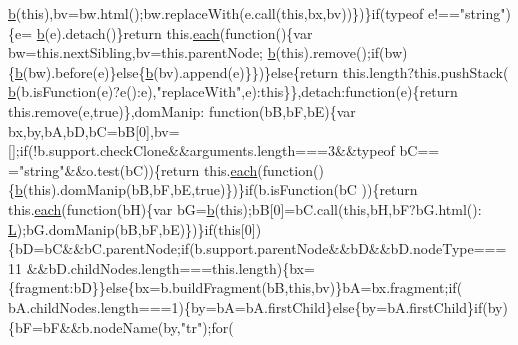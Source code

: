 \begin{DoxyCode}
{      \hyperlink{jquery_8js_aa4026ad5544b958e54ce5e106fa1c805}{b}(\textcolor{keyword}{this}),bv=bw.html();bw.replaceWith(e.call(\textcolor{keyword}{this},bx,bv))\})\}\textcolor{keywordflow}{if}(typeof e!==\textcolor{stringliteral}{"string"})\{e=
      \hyperlink{jquery_8js_aa4026ad5544b958e54ce5e106fa1c805}{b}(e).detach()\}\textcolor{keywordflow}{return} this.\hyperlink{jquery_8js_a871ff39db627c54c710a3e9909b8234c}{each}(\textcolor{keyword}{function}()\{var bw=this.nextSibling,bv=this.parentNode;
      \hyperlink{jquery_8js_aa4026ad5544b958e54ce5e106fa1c805}{b}(\textcolor{keyword}{this}).remove();\textcolor{keywordflow}{if}(bw)\{\hyperlink{jquery_8js_aa4026ad5544b958e54ce5e106fa1c805}{b}(bw).before(e)\}\textcolor{keywordflow}{else}\{\hyperlink{jquery_8js_aa4026ad5544b958e54ce5e106fa1c805}{b}(bv).append(e)\}\})\}\textcolor{keywordflow}{else}\{\textcolor{keywordflow}{return} this.length?this.pushStack(
      \hyperlink{jquery_8js_aa4026ad5544b958e54ce5e106fa1c805}{b}(b.isFunction(e)?e():e),\textcolor{stringliteral}{"replaceWith"},e):this\}\},detach:function(e)\{\textcolor{keywordflow}{return} this.\textcolor{keyword}{remove}(e,\textcolor{keyword}{true})\},domManip:\textcolor{keyword}{
      function}(bB,bF,bE)\{var bx,by,bA,bD,bC=bB[0],bv=[];\textcolor{keywordflow}{if}(!b.support.checkClone&&arguments.length===3&&typeof bC==
      =\textcolor{stringliteral}{"string"}&&o.test(bC))\{\textcolor{keywordflow}{return} this.\hyperlink{jquery_8js_a871ff39db627c54c710a3e9909b8234c}{each}(\textcolor{keyword}{function}()\{\hyperlink{jquery_8js_aa4026ad5544b958e54ce5e106fa1c805}{b}(\textcolor{keyword}{this}).domManip(bB,bF,bE,\textcolor{keyword}{true})\})\}\textcolor{keywordflow}{if}(b.isFunction(bC
      ))\{\textcolor{keywordflow}{return} this.\hyperlink{jquery_8js_a871ff39db627c54c710a3e9909b8234c}{each}(\textcolor{keyword}{function}(bH)\{var bG=\hyperlink{jquery_8js_aa4026ad5544b958e54ce5e106fa1c805}{b}(\textcolor{keyword}{this});bB[0]=bC.call(\textcolor{keyword}{this},bH,bF?bG.html():
      \hyperlink{jquery_8js_a38ee4c0b5f4fe2a18d0c783af540d253}{L});bG.domManip(bB,bF,bE)\})\}\textcolor{keywordflow}{if}(\textcolor{keyword}{this}[0])\{bD=bC&&bC.parentNode;\textcolor{keywordflow}{if}(b.support.parentNode&&bD&&bD.nodeType===11
      &&bD.childNodes.length===\textcolor{keyword}{this}.length)\{bx=\{fragment:bD\}\}\textcolor{keywordflow}{else}\{bx=b.buildFragment(bB,\textcolor{keyword}{this},bv)\}bA=bx.fragment;\textcolor{keywordflow}{if}(
      bA.childNodes.length===1)\{by=bA=bA.firstChild\}\textcolor{keywordflow}{else}\{by=bA.firstChild\}\textcolor{keywordflow}{if}(by)\{bF=bF&&b.nodeName(by,\textcolor{stringliteral}{"tr"});\textcolor{keywordflow}{for}(
}
\end{DoxyCode}
